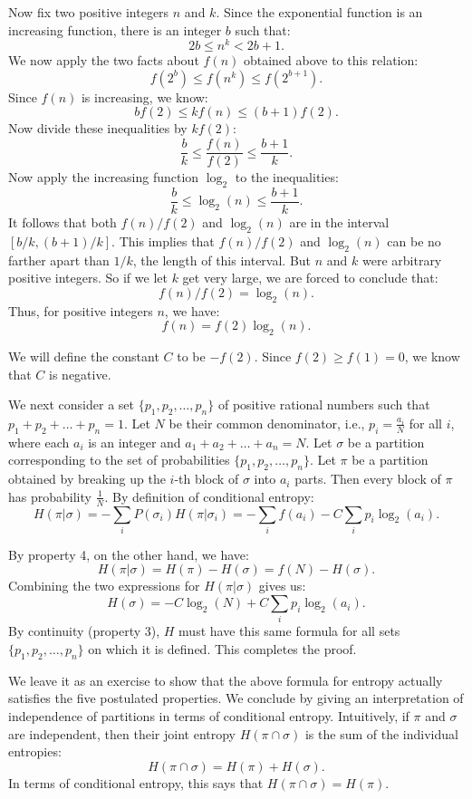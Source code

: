 \documentclass{report}
\begin{document}
Now fix two positive integers \( n \) and \( k \). Since the exponential function is an increasing function, there is an integer \( b \) such that:
\[
2b \leq n^k < 2b+1.
\]
We now apply the two facts about \( f(n) \) obtained above to this relation:
\[
f(2^b) \leq f(n^k) \leq f(2^{b+1}).
\]
Since \( f(n) \) is increasing, we know:
\[
b f(2) \leq k f(n) \leq (b+1)f(2).
\]
Now divide these inequalities by \( k f(2) \):
\[
\frac{b}{k} \leq \frac{f(n)}{f(2)} \leq \frac{b+1}{k}.
\]
Now apply the increasing function \( \log_2 \) to the inequalities:
\[
\frac{b}{k} \leq \log_2(n) \leq \frac{b+1}{k}.
\]
It follows that both \( f(n)/f(2) \) and \( \log_2(n) \) are in the interval \( [b/k, (b+1)/k] \). This implies that \( f(n)/f(2) \) and \( \log_2(n) \) can be no farther apart than \( 1/k \), the length of this interval. But \( n \) and \( k \) were arbitrary positive integers. So if we let \( k \) get very large, we are forced to conclude that:
\[
f(n)/f(2) = \log_2(n).
\]
Thus, for positive integers \( n \), we have:
\[
f(n) = f(2) \log_2(n).
\]

We will define the constant \( C \) to be \( -f(2) \). Since \( f(2) \geq f(1) = 0 \), we know that \( C \) is negative.

We next consider a set \( \{p_1, p_2, \ldots, p_n\} \) of positive rational numbers such that \( p_1 + p_2 + \ldots + p_n = 1 \). Let \( N \) be their common denominator, i.e., \( p_i = \frac{a_i}{N} \) for all \( i \), where each \( a_i \) is an integer and \( a_1 + a_2 + \ldots + a_n = N \). Let \( \sigma \) be a partition corresponding to the set of probabilities \( \{p_1, p_2, \ldots, p_n\} \). Let \( \pi \) be a partition obtained by breaking up the \( i \)-th block of \( \sigma \) into \( a_i \) parts. Then every block of \( \pi \) has probability \( \frac{1}{N} \). By definition of conditional entropy:
\[
H(\pi|\sigma) = -\sum_{i} P(\sigma_i) H(\pi|\sigma_i) = -\sum_{i} f(a_i) - C \sum_{i} p_i \log_2(a_i).
\]

By property 4, on the other hand, we have:
\[
H(\pi|\sigma) = H(\pi) - H(\sigma) = f(N) - H(\sigma).
\]
Combining the two expressions for \( H(\pi|\sigma) \) gives us:
\[
H(\sigma) = -C \log_2(N) + C \sum_{i} p_i \log_2(a_i).
\]
By continuity (property 3), \( H \) must have this same formula for all sets \( \{p_1, p_2, \ldots, p_n\} \) on which it is defined. This completes the proof.

We leave it as an exercise to show that the above formula for entropy actually satisfies the five postulated properties. We conclude by giving an interpretation of independence of partitions in terms of conditional entropy. Intuitively, if \( \pi \) and \( \sigma \) are independent, then their joint entropy \( H(\pi \cap \sigma) \) is the sum of the individual entropies:
\[
H(\pi \cap \sigma) = H(\pi) + H(\sigma).
\]
In terms of conditional entropy, this says that \( H(\pi \cap \sigma) = H(\pi) \).
\end{document}
